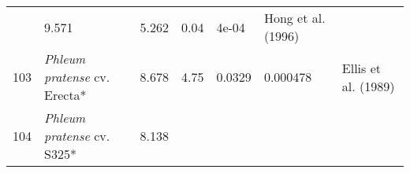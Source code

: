 \documentclass[]{article}
\begin{document}
\begin{longtable}[]{@{}lllllll@{}}
\begin{minipage}[t]{0.23\columnwidth}
\end{minipage} & \begin{minipage}[t]{0.05\columnwidth}\raggedright
9.571\strut
\end{minipage} & \begin{minipage}[t]{0.08\columnwidth}\raggedright
5.262\strut
\end{minipage} & \begin{minipage}[t]{0.08\columnwidth}\raggedright
0.04\strut
\end{minipage} & \begin{minipage}[t]{0.08\columnwidth}\raggedright
4e-04\strut
\end{minipage} & \begin{minipage}[t]{0.23\columnwidth}\raggedright
Hong et al. (1996)\strut
\end{minipage}\tabularnewline
\begin{minipage}[t]{0.05\columnwidth}\raggedright
103\strut
\end{minipage} & \begin{minipage}[t]{0.23\columnwidth}\raggedright
\emph{Phleum pratense }cv. Erecta*\strut
\end{minipage} & \begin{minipage}[t]{0.05\columnwidth}\raggedright
8.678\strut
\end{minipage} & \begin{minipage}[t]{0.08\columnwidth}\raggedright
4.75\strut
\end{minipage} & \begin{minipage}[t]{0.08\columnwidth}\raggedright
0.0329\strut
\end{minipage} & \begin{minipage}[t]{0.08\columnwidth}\raggedright
0.000478\strut
\end{minipage} & \begin{minipage}[t]{0.23\columnwidth}\raggedright
Ellis et al. (1989)\strut
\end{minipage}\tabularnewline
\begin{minipage}[t]{0.05\columnwidth}\raggedright
104\strut
\end{minipage} & \begin{minipage}[t]{0.23\columnwidth}\raggedright
\emph{Phleum pratense }cv. S325*\strut
\end{minipage} & \begin{minipage}[t]{0.05\columnwidth}\raggedright
8.138\strut
\end{minipage} & \begin{minipage}[t]{0.08\columnwidth}\raggedright

\end{minipage}
\end{longtable}
\end{document}
